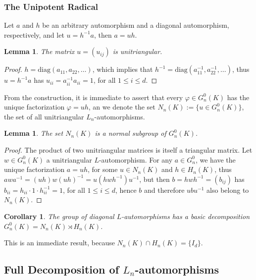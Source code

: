 \documentclass{article}
\newtheorem{lemma4}[paragraph]{Lemma}
\newtheorem{corollary4}[paragraph]{Corollary}
\begin{document}
\subsubsection{The Unipotent Radical}
Let $a$ and $h$ be an arbitrary automorphism and a diagonal automorphism, respectively, and let $u=h^{-1}a$, then $a=uh$.
\begin{lemma4}
\label{lem:u-unitriangular}
The matrix $u=(u_{ij})$ is unitriangular.
\end{lemma4}
\begin{proof}
$h=\mathrm{diag}(a_{11},a_{22},\dots)$, which implies that $h^{-1}=\mathrm{diag}(a_{11}^{-1},a_{22}^{-1},\dots)$, thus $u=h^{-1}a$ has $u_{ii}=a_{ii}^{-1}a_{ii}=1$, for all $1\leq{i}\leq{d}$.
\end{proof}
From the construction, it is immediate to assert that every $\varphi\in{G}_n^0(K)$ has the unique factorization $\varphi=uh$, an we denote the set $N_n(K):=\{u\in{G}_n^0(K)\}$, the set of all unitriangular $L_n$-automorphisms.
\begin{lemma4}
\label{lem:n-normal-subgroup}
The set $N_n(K)$ is a normal subgroup of $G_n^0(K)$.
\end{lemma4}
\begin{proof}
The product of two unitriangular matrices is itself a triangular matrix. Let $w\in{G}_n^0(K)$ a unitriangular ${L}$-automorphism. For any $a\in{G}_n^0$, we have the unique factorization $a=uh$, for some $u\in{N}_n(K)$ and $h\in{H}_n(K)$, thus $awa^{-1}=(uh)w(uh)^{-1}=u(hwh^{-1})u^{-1}$, but then $b=hwh^{-1}=(b_{ij})$ has $b_{ii}=h_{ii}\cdot{1}\cdot{h}_{ii}^{-1}=1$, for all $1\leq{i}\leq{d}$, hence $b$ and therefore $ubu^{-1}$ also belong to $N_n(K)$.
\end{proof}
\begin{corollary4}
The group of diagonal ${L}$-automorphisms has a basic decomposition $G_n^0(K)=N_n(K)\rtimes{H}_n(K)$.
\end{corollary4}
This is an immediate result, because $N_n(K)\cap{H}_n(K)=\{I_d\}$.
\subsection{Full Decomposition of $L_n$-automorphisms}
\end{document}

